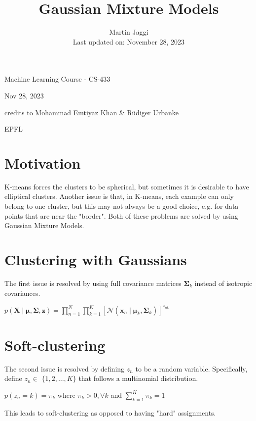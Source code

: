 \documentclass[10pt]{article}
\title{Gaussian Mixture Models }
\author{Martin Jaggi\\
Last updated on: November 28, 2023}
\date{}
\begin{document}
\maketitle
Machine Learning Course - CS-433

Nov 28, 2023

credits to Mohammad Emtiyaz Khan \& Rüdiger Urbanke

EPFL

\section*{Motivation}
K-means forces the clusters to be spherical, but sometimes it is desirable to have elliptical clusters. Another issue is that, in K-means, each example can only belong to one cluster, but this may not always be a good choice, e.g. for data points that are near the "border". Both of these problems are solved by using Gaussian Mixture Models.

\section*{Clustering with Gaussians}
The first issue is resolved by using full covariance matrices $\boldsymbol{\Sigma}_{k}$ instead of isotropic covariances.

$p(\mathbf{X} \mid \boldsymbol{\mu}, \boldsymbol{\Sigma}, \mathbf{z})=\prod_{n=1}^{N} \prod_{k=1}^{K}\left[\mathcal{N}\left(\mathbf{x}_{n} \mid \boldsymbol{\mu}_{k}, \boldsymbol{\Sigma}_{k}\right)\right]^{z_{n k}}$

\section*{Soft-clustering}
The second issue is resolved by defining $z_{n}$ to be a random variable. Specifically, define $z_{n} \in$ $\{1,2, \ldots, K\}$ that follows a multinomial distribution.

$p\left(z_{n}=k\right)=\pi_{k}$ where $\pi_{k}>0, \forall k$ and $\sum_{k=1}^{K} \pi_{k}=1$

This leads to soft-clustering as opposed to having "hard" assignments.
\end{document}
